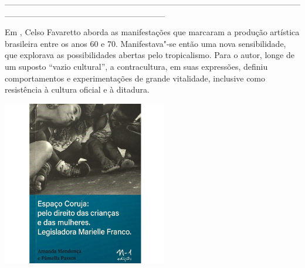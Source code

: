 {\hspace*{-2cm}\_\_\_\_\_\_\_\_\_\_\_\_\_\_\_\_\_\_\_\_\_\_\_\_\_\_\_\_\_\_\_\_\_\_\_\_\_\_\_\_\_\_\_\_\_\_\_\_\_\_\_\_\_\_\_\_\_\_\_\_\_\_\_\_\_\_\_\_\_\_\_\_\_\_

\medskip

\noindent{}Em {}, Celso Favaretto aborda as manifestações que marcaram a produção artística brasileira entre os anos 60 e 70. Manifestava"-se então uma nova sensibilidade, que explorava as possibilidades abertas pelo tropicalismo. Para o autor, longe de um suposto “vazio cultural”, a contracultura, em suas expressões, definiu comportamentos e experimentações de grande vitalidade, inclusive como resistência à cultura oficial e à ditadura.

\vfill

\hspace*{-.4cm}\begin{minipage}[c]{1\linewidth}
\small{
{}}
\end{minipage}

\pagebreak

\hspace{.5cm}

\begin{center}
\hspace*{-.5cm}\includegraphics[width=72mm]{./grid/coruja.jpg}
\end{center}

}
